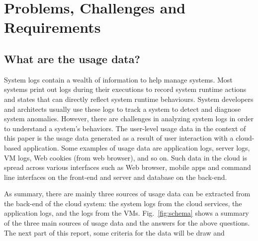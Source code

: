 \section{Problems, Challenges and Requirements}

\subsection{What are the usage data?}

System logs contain a wealth of information to help manage systems. Most systems print out  logs during their executions to record system runtime actions and states that can directly reflect system runtime behaviours. System developers and architects usually use these logs to track a system to detect and diagnose system anomalies. However, there are challenges in analyzing system logs in order to understand a system’s behaviors. 
The user-level usage data in the context of this paper is the usage data generated as a result of user interaction with a cloud-based application. Some examples of usage data are  application logs, server logs, VM logs, Web cookies (from web browser), and so on. Such data in the cloud is spread across various interfaces such as Web browser, mobile apps and command line interfaces on the front-end and server and database on the back-end.  

As summary, there are mainly three sources of usage data can be extracted from the back-end of the cloud system: the system logs from the cloud services, the application logs, and the logs from the VMs. Fig.~\ref{fig:schema} shows a summary of the three main sources of usage data and the answers for the above questions. The next part of this report, some criteria for the data will be draw and 


